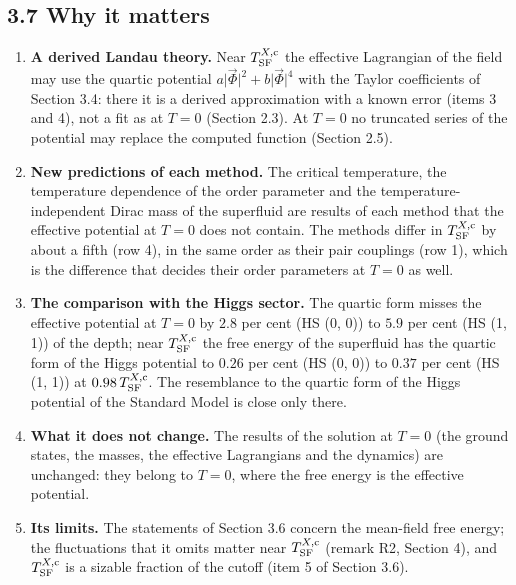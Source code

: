 \documentclass[
  10pt,
]{article}
\providecommand{\tightlist}{%
  \setlength{\itemsep}{0pt}\setlength{\parskip}{0pt}}
\begin{document}
\hypertarget{why-it-matters-1}{%
\subsection{3.7 Why it matters}\label{why-it-matters-1}}

\begin{enumerate}
\def\labelenumi{\arabic{enumi}.}
\tightlist
\item
  \textbf{A derived Landau theory.} Near \(T^{X,{\rm c}}_{\rm SF}\) the
  effective Lagrangian of the field may use the quartic potential
  \(a\lvert\vec\Phi\rvert^2+b\lvert\vec\Phi\rvert^4\) with the Taylor
  coefficients of Section 3.4: there it is a derived approximation with
  a known error (items 3 and 4), not a fit as at \(T=0\) (Section 2.3).
  At \(T=0\) no truncated series of the potential may replace the
  computed function (Section 2.5).
\item
  \textbf{New predictions of each method.} The critical temperature, the
  temperature dependence of the order parameter and the
  temperature-independent Dirac mass of the superfluid are results of
  each method that the effective potential at \(T=0\) does not contain.
  The methods differ in \(T^{X,{\rm c}}_{\rm SF}\) by about a fifth (row
  4), in the same order as their pair couplings (row 1), which is the
  difference that decides their order parameters at \(T=0\) as well.
\item
  \textbf{The comparison with the Higgs sector.} The quartic form misses
  the effective potential at \(T=0\) by \(2.8\) per cent (HS (0, 0)) to
  \(5.9\) per cent (HS (1, 1)) of the depth; near
  \(T^{X,{\rm c}}_{\rm SF}\) the free energy of the superfluid has the
  quartic form of the Higgs potential to \(0.26\) per cent (HS (0, 0))
  to \(0.37\) per cent (HS (1, 1)) at \(0.98\,T^{X,{\rm c}}_{\rm SF}\).
  The resemblance to the quartic form of the Higgs potential of the
  Standard Model is close only there.
\item
  \textbf{What it does not change.} The results of the solution at
  \(T=0\) (the ground states, the masses, the effective Lagrangians and
  the dynamics) are unchanged: they belong to \(T=0\), where the free
  energy is the effective potential.
\item
  \textbf{Its limits.} The statements of Section 3.6 concern the
  mean-field free energy; the fluctuations that it omits matter near
  \(T^{X,{\rm c}}_{\rm SF}\) (remark R2, Section 4), and
  \(T^{X,{\rm c}}_{\rm SF}\) is a sizable fraction of the cutoff (item 5
  of Section 3.6).
\end{enumerate}
\end{document}
